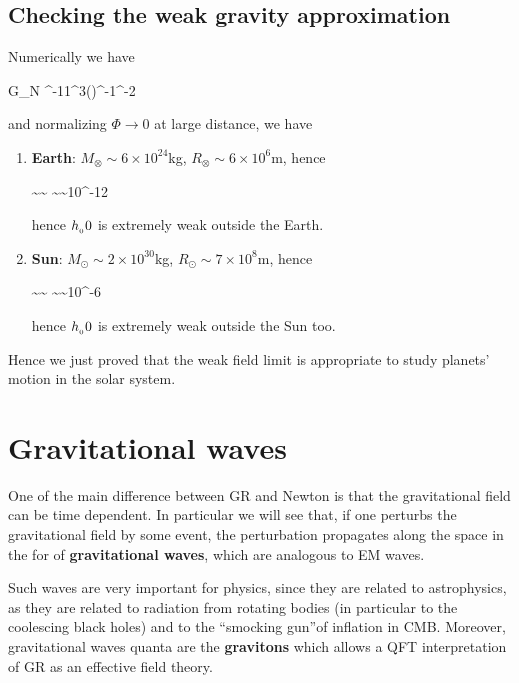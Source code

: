 \documentclass[../main/main.tex]{subfiles}
\begin{document}
\subsection{Checking the weak gravity approximation}

Numerically we have
\begin{eqalign}
	G_N ^{-11}^3()^{-1}{}^{-2}
\end{eqalign}
and normalizing $\Phi\to0$ at large distance, we have
\begin{enumerate}[label=\textbullet]
	\item \textbf{Earth}: $M_\otimes \sim 6\times10^{24}$kg, $R_\otimes\sim6\times10^6$m, hence
		\begin{eqalign}
			\sim{}\sim{} \sim {}\sim10^{-12}
		\end{eqalign}
		hence $h_{_ 0}0$ is extremely weak outside the Earth. 
	\item \textbf{Sun}: $M_\odot \sim 2\times10^{30}$kg, $R_\odot\sim7\times10^8$m, hence
		\begin{eqalign}
			\sim{}\sim{} \sim {}\sim10^{-6}\lll1
		\end{eqalign}
		hence $h_{_ 0}0$ is extremely weak outside the Sun too. 
\end{enumerate}

Hence we just proved that the weak field limit is appropriate to study planets' motion in the solar system. 

\section{Gravitational waves}

One of the main difference between GR and Newton is that the gravitational field can be time dependent. In particular we will see that, if one perturbs the gravitational field by some event, the perturbation propagates along the space in the for of \textbf{gravitational waves}, which are analogous to EM waves. 

Such waves are very important for physics, since they are related to astrophysics, as they are related to radiation from rotating bodies (in particular to the coolescing black holes) and to the ``smocking gun''of inflation in CMB. Moreover, gravitational waves quanta are the \textbf{gravitons} which allows a QFT interpretation of GR as an effective field theory. 
\end{document}
